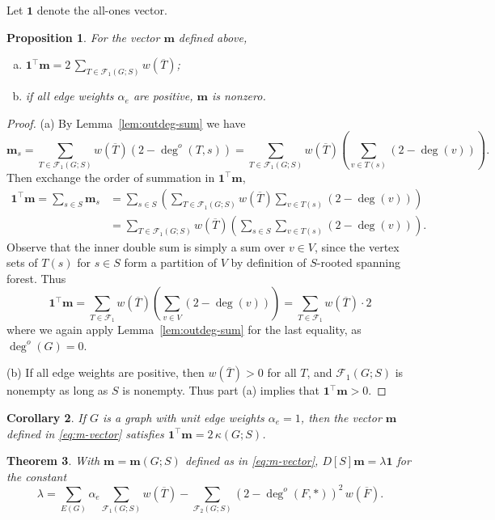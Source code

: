 \documentclass{amsart}
\newtheorem{thm}{Theorem}[section]
\newtheorem{prop}[thm]{Proposition}
\newtheorem{cor}[thm]{Corollary}
\theoremstyle{definition}
\newcommand{\bone}{\mathbf{1}}
\newcommand{\boldm}{\mathbf{m}}
\newcommand{\tr}{\intercal}
\newcommand{\trees}{\mathcal{F}_1}
\newcommand{\forests}{\mathcal{F}}
\newcommand{\degout}{\deg^o}
\begin{document}
Let $\bone$ denote the all-ones vector.
\begin{prop}
\label{prop:m-sum}
For the vector $\boldm$ defined above, 
\begin{enumerate}[(a)]
\item 
$\displaystyle \bone^\tr \boldm = 2 \,\sum_{T \in \trees(G;S)} w(\overline{T})$;

\item 
if all edge weights $\alpha_e$ are positive, $\boldm$ is nonzero.
\end{enumerate}
\end{prop}
\begin{proof}
(a)
By Lemma~\ref{lem:outdeg-sum} we have
\[
\boldm_s = \sum_{T \in \trees(G;S)} w(\overline{T}) (2 - \degout (T,s))
= \sum_{T \in \trees(G;S)} w(\overline{T}) \left( \sum_{v \in T(s)}(2 - \deg(v))\right).
\]
Then exchange the order of summation in $\bone^\tr \boldm$,
\begin{align}
	\bone^\tr \boldm = \sum_{s\in S} \boldm_s &= \sum_{s \in S} \left( \sum_{T \in \trees(G;S)} w(\overline{T}) \sum_{v \in T(s)}(2 - \deg(v)) \right) \\
	&= \sum_{T \in \trees(G;S)} w(\overline{T}) \left( \sum_{s\in S} \sum_{v \in T(s)} (2 - \deg(v)) \right) .
\end{align}
Observe that the inner double sum is simply a sum over $v \in V$,
since the vertex sets of $T(s)$ for $s \in S$ form a partition of $V$ by definition of $S$-rooted spanning forest.
Thus 
\[
	\bone^\tr \boldm = \sum_{T \in \trees} w(\overline{T}) \left( \sum_{v \in V} (2 - \deg(v))\right)
	= \sum_{T \in \trees} w(\overline{T}) \cdot 2 
\]
where we again apply Lemma~\ref{lem:outdeg-sum} for the last equality, as $\degout(G) = 0$.

(b) 
If all edge weights are positive, then $w(\overline{T}) > 0$ for all $T$, and $\trees(G; S)$ is nonempty as long as $S$ is nonempty. 
Thus part (a) implies that $\bone^\tr \boldm > 0$.
\end{proof}

\begin{cor}
If $G$ is a graph with unit edge weights $\alpha_e = 1$, then the vector $\boldm$ defined in \eqref{eq:m-vector} satisfies $\bone^\tr \boldm = 2\, \kappa(G;S)$.
\end{cor}

\begin{thm}
\label{thm:m-distance-product}
With $\boldm = \boldm(G;S)$ defined as in \eqref{eq:m-vector},
$D[S] \boldm = \lambda \mathbf{1}$
for the constant
\begin{equation}
\label{eq:lambda}
	\lambda = \sum_{E(G)} \alpha_e \sum_{\trees(G;S)} w(\overline{T}) - \sum_{\forests_2(G;S)} (2 - \degout(F,*) )^2 \, w(\overline{F}) .
\end{equation}
\end{thm}
\end{document}

